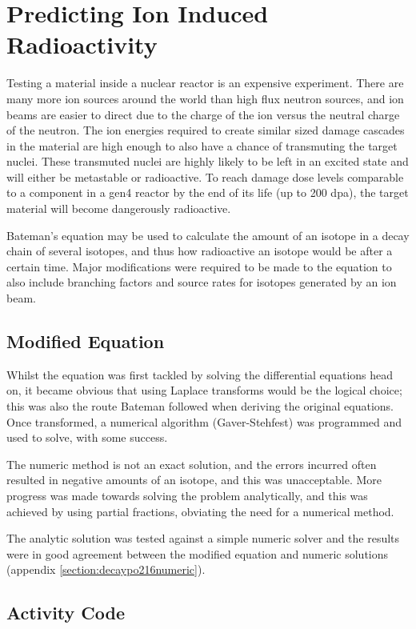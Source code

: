 \section{Predicting Ion Induced Radioactivity}

Testing a material inside a nuclear reactor is an expensive experiment.  There are many more ion sources around the world than high flux neutron sources, and ion beams are easier to direct due to the charge of the ion versus the neutral charge of the neutron.  The ion energies required to create similar sized damage cascades in the material are high enough to also have a chance of transmuting the target nuclei.  These transmuted nuclei are highly likely to be left in an excited state and will either be metastable or radioactive.  To reach damage dose levels comparable to a component in a \acrshort{gen4} reactor by the end of its life (up to 200 \acrshort{dpa}), the target material will become dangerously radioactive. 

Bateman's equation may be used to calculate the amount of an isotope in a decay chain of several isotopes, and thus how radioactive an isotope would be after a certain time.  Major modifications were required to be made to the equation to also include branching factors and source rates for isotopes generated by an ion beam.

\subsection{Modified Equation}

Whilst the equation was first tackled by solving the differential equations head on, it became obvious that using Laplace transforms would be the logical choice; this was also the route Bateman followed when deriving the original equations.  Once transformed, a numerical algorithm (Gaver-Stehfest) was programmed and used to solve, with some success.  

The numeric method is not an exact solution, and the errors incurred often resulted in negative amounts of an isotope, and this was unacceptable.  More progress was made towards solving the problem analytically, and this was achieved by using partial fractions, obviating the need for a numerical method. 

The analytic solution was tested against a simple numeric solver and the results were in good agreement between the modified equation and numeric solutions (appendix \ref{section:decaypo216numeric}).

\subsection{Activity Code}


